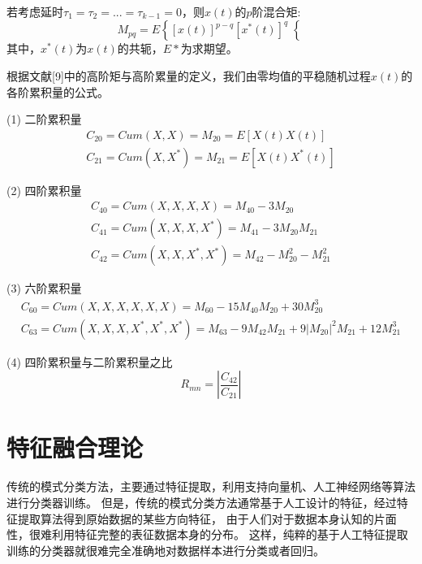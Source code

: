 若考虑延时$\tau_1 = \tau_2 = ... = \tau_{k-1} = 0$，则$x(t)$的$p$阶混合矩:
\begin{equation}
\label{eqt_4_9}
M_{pq} = E\left\lbrace \left[ x(t)\right]^{p-q} 
\left[ x^*(t)\right]^{q}\right\lbrace 
\end{equation}
其中，$x^*(t)$为$x(t)$的共轭，$E{*}$为求期望。\par
根据文献[9]中的高阶矩与高阶累量的定义，我们由零均值的平稳随机过程$x(t)$的各阶累积量的公式。

(1) 二阶累积量
\begin{equation}
\label{eqt_4_10}
\begin{aligned}
C_{20} = Cum(X, X) = M_{20} = E[X(t)X(t)]\\
C_{21} = Cum(X, X^*) = M_{21} = E[X(t)X^*(t)]	
\end{aligned}
\end{equation}

(2) 四阶累积量
\begin{equation}
\label{eqt_4_11}
\begin{aligned}
C_{40}=Cum(X, X, X, X) = M_{40} - 3M_{20}\\
C_{41}=Cum(X, X, X, X^*) = M_{41} - 3M_{20}M_{21}\\
C_{42}=Cum(X, X, X^*, X^*) = M_{42} - M_{20}^2 - M_{21}^2
\end{aligned}
\end{equation}

(3) 六阶累积量
\begin{equation}
\label{eqt_4_12}
\begin{aligned}
C_{60}=Cum(X, X, X, X, X, X) = M_{60} - 15M_{40}M_{20} + 30M_{20}^3\\
C_{63}=Cum(X, X, X, X^*, X^*, X^*) = M_{63} - 9M_{42}M_{21} 
+ 9\left|M_{20}\right|^2M_{21} + 12M_{21}^3
\end{aligned}
\end{equation}

(4) 四阶累积量与二阶累积量之比
\begin{equation}
\label{eqt_4_13}
R_{mn} = |\frac{C_{42}}{C_{21}}|
\end{equation}

\section{特征融合理论}
传统的模式分类方法，主要通过特征提取，利用支持向量机、人工神经网络等算法进行分类器训练。 
但是，传统的模式分类方法通常基于人工设计的特征，经过特征提取算法得到原始数据的某些方向特征，
由于人们对于数据本身认知的片面性，很难利用特征完整的表征数据本身的分布。
这样，纯粹的基于人工特征提取训练的分类器就很难完全准确地对数据样本进行分类或者回归。\par

